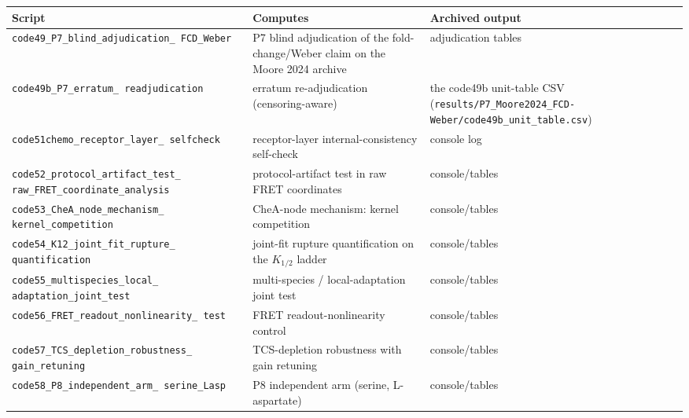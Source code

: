 \documentclass[11pt]{article}
\begin{document}
\begin{longtable}{p{4.8cm} p{6.8cm} p{4.2cm}}
\toprule
Script & Computes & Archived output \\
\midrule
\endhead
\texttt{code49\_\allowbreak{}P7\_\allowbreak{}blind\_\allowbreak{}adjudication\_\allowbreak{} FCD\_\allowbreak{}Weber} & P7 blind adjudication of the fold-change/Weber claim on the Moore 2024 archive & adjudication tables \\
\texttt{code49b\_\allowbreak{}P7\_\allowbreak{}erratum\_\allowbreak{} readjudication} & erratum re-adjudication (censoring-aware) & the code49b unit-table CSV (\texttt{results/P7\_\allowbreak{}Moore2024\_\allowbreak{}FCD-Weber/code49b\_\allowbreak{}unit\_\allowbreak{}table.csv}) \\
\texttt{code51chemo\_\allowbreak{}receptor\_\allowbreak{}layer\_\allowbreak{} selfcheck} & receptor-layer internal-consistency self-check & console log \\
\texttt{code52\_\allowbreak{}protocol\_\allowbreak{}artifact\_\allowbreak{}test\_\allowbreak{} raw\_\allowbreak{}FRET\_\allowbreak{}coordinate\_\allowbreak{}analysis} & protocol-artifact test in raw FRET coordinates & console/tables \\
\texttt{code53\_\allowbreak{}CheA\_\allowbreak{}node\_\allowbreak{}mechanism\_\allowbreak{} kernel\_\allowbreak{}competition} & CheA-node mechanism: kernel competition & console/tables \\
\texttt{code54\_\allowbreak{}K12\_\allowbreak{}joint\_\allowbreak{}fit\_\allowbreak{}rupture\_\allowbreak{} quantification} & joint-fit rupture quantification on the $K_{1/2}$ ladder & console/tables \\
\texttt{code55\_\allowbreak{}multispecies\_\allowbreak{}local\_\allowbreak{} adaptation\_\allowbreak{}joint\_\allowbreak{}test} & multi-species / local-adaptation joint test & console/tables \\
\texttt{code56\_\allowbreak{}FRET\_\allowbreak{}readout\_\allowbreak{}nonlinearity\_\allowbreak{} test} & FRET readout-nonlinearity control & console/tables \\
\texttt{code57\_\allowbreak{}TCS\_\allowbreak{}depletion\_\allowbreak{}robustness\_\allowbreak{} gain\_\allowbreak{}retuning} & TCS-depletion robustness with gain retuning & console/tables \\
\texttt{code58\_\allowbreak{}P8\_\allowbreak{}independent\_\allowbreak{}arm\_\allowbreak{} serine\_\allowbreak{}Lasp} & P8 independent arm (serine, L-aspartate) & console/tables \\

\end{longtable}
\end{document}
